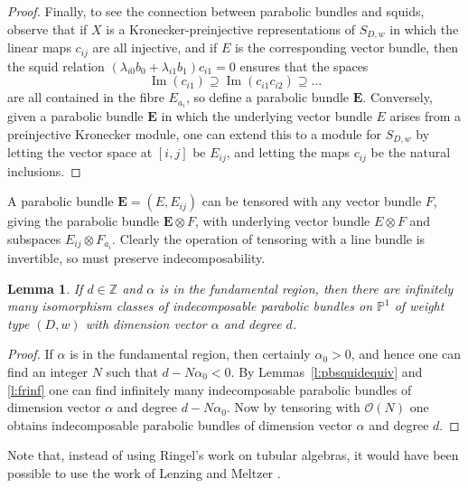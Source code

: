 \documentclass{amsart}
\theoremstyle{plain}
\newtheorem{lem}[thm]{Lemma}
\theoremstyle{definition}
\theoremstyle{remark}
\newcommand{\Z}{\mathbb{Z}}
\newcommand{\PP}{\mathbb{P}}
\DeclareMathOperator{\Ima}{Im}
\newcommand{\OO}{\mathcal{O}}
\newcommand{\E}{\mathbf{E}}
\begin{document}
\begin{proof}
Finally, to see the connection between parabolic bundles and squids,
observe that if $X$ is a Kronecker-preinjective representations of $S_{D,w}$ in which
the linear maps $c_{ij}$ are all injective, and if
$E$ is the corresponding vector bundle, then the squid relation
$(\lambda_{i0} b_0+\lambda_{i1} b_1)c_{i1} = 0$
ensures that the spaces
\[
\Ima(c_{i1}) \supseteq \Ima(c_{i1}c_{i2}) \supseteq \dots
\]
are all contained in the fibre $E_{a_i}$, so define a parabolic bundle $\E$.
Conversely, given a parabolic bundle $\E$ in which the underlying vector
bundle $E$ arises from a preinjective Kronecker module, one can extend this
to a module for $S_{D,w}$ by letting the vector space at $[i,j]$ be $E_{ij}$,
and letting the maps $c_{ij}$ be the natural inclusions.
\end{proof}


A parabolic bundle $\E = (E,E_{ij})$ can be tensored with any vector bundle $F$, giving the
parabolic bundle $\E\otimes F$, with underlying vector bundle $E\otimes F$ and
subspaces $E_{ij}\otimes F_{a_i}$.
Clearly the operation of tensoring with a line bundle is invertible,
so must preserve indecomposability.


\begin{lem}\label{l:infindpbfr}
If $d\in\Z$ and $\alpha$ is in the fundamental region,
then there are infinitely many isomorphism classes of indecomposable
parabolic bundles on $\PP^1$ of weight type $(D,w)$ with dimension vector $\alpha$ and degree $d$.
\end{lem}


\begin{proof}
If $\alpha$ is in the fundamental region, then certainly $\alpha_0>0$, and hence
one can find an integer $N$ such that $d-N\alpha_0 < 0$. By
Lemmas~\ref{l:pbsquidequiv} and \ref{l:frinf} one can find infinitely many
indecomposable parabolic bundles of dimension vector $\alpha$ and degree $d-N\alpha_0$.
Now by tensoring with $\OO(N)$ one obtains
indecomposable parabolic bundles of dimension vector $\alpha$ and degree $d$.
\end{proof}


Note that, instead of using Ringel's work on tubular algebras, it would
have been possible to use the work of Lenzing and Meltzer \cite{LM}.
\end{document}
